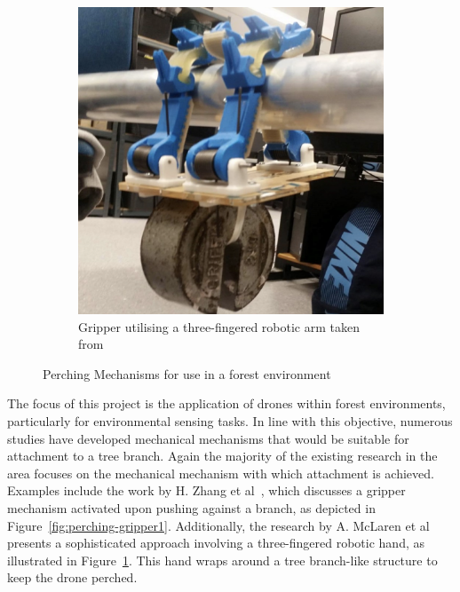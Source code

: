 \begin{figure}[ht]
\begin{subfigure}[b]{0.45\textwidth}
      \includegraphics[width=\textwidth]{background/perching-gripper2.png}
      \caption{Gripper utilising a three-fingered robotic arm taken from~\cite{perching-gripper2}}
      \label{fig:perching-gripper2}
  \end{subfigure}
  \caption{Perching Mechanisms for use in a forest environment}
  \label{fig:perching-grippers}
\end{figure}

The focus of this project is the application of drones within forest environments, particularly for environmental sensing tasks. 
In line with this objective, numerous studies have developed mechanical mechanisms that would be suitable for attachment to a tree branch. 
Again the majority of the existing research in the area focuses on the mechanical mechanism with which attachment is achieved. 
Examples include the work by H. Zhang et al~\cite{perching-gripper1}, which discusses a gripper mechanism activated upon pushing against a branch, as depicted in Figure~\ref{fig:perching-gripper1}. 
Additionally, the research by A. McLaren et al~\cite{perching-gripper2} presents a sophisticated approach involving a three-fingered robotic hand, as illustrated in Figure~\ref{fig:perching-gripper2}.
This hand wraps around a tree branch-like structure to keep the drone perched.

